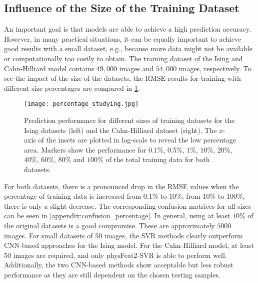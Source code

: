 \documentclass[11pt, authoryear]{elsarticle}
\begin{document}
	\subsection{Influence of the Size of the Training Dataset}
	An important goal is that models are able to achieve a high prediction 
	accuracy. However, in many practical situations, it can be equally important to
	achieve good results with a small dataset, e.g., because more data might not be
	available or computationally too costly to obtain. The training dataset of the Ising and Cahn-Hilliard model 
	contains $49,000$ images and $54,000$ 
	images, respectively. To see the impact of the size of the datasets, the RMSE results 
	for training with different size percentages are compared in 
	\cref{fig:percentage_studying}.
	\begin{figure}
		\centering
		\texttt{[image: percentage\_studying.jpg]}
		\caption{%
			Prediction performance for different sizes of training datasets
			for the Ising datasets (left) and the Cahn-Hilliard dataset (right).
			The $x$-axis of the insets are plotted in log-scale to reveal
			the low percentage area. Markers show the performance for 
			$0.1 \%$, $0.5 \%$, $1 \%$, $10 \%$, $20 \%$, $40 \%$, $60 \%$, 
			$80 \%$ and $100 \%$ of the total training data for both datasets.}
		\label{fig:percentage_studying}
	\end{figure}
	For both datasets, there is a pronounced drop in the RMSE values when the 
	percentage of training data is increased from $0.1\%$ to $10\%$; from 
	$10\%$ to $100\%$, there is only a slight decrease. The corresponding 
	confusion matrices for all sizes can be seen in
	\ref{appendix:confusion_percentage}. In general, using at least $10\%$ of the
	original datasets is a good compromise. These are approximately $5000$ images. 
	For small datasets of 50 images, the \gls{SVR} methods clearly outperform 
	CNN-based approaches for the Ising model. For the Cahn-Hilliard model, at least
	50 images are required, and only physFeat2-SVR is able to perform well.
	Additionally, the two CNN-based methods show acceptable but less robust 
	performance as they are still dependent on the chosen testing samples.
	
	
\end{document}
